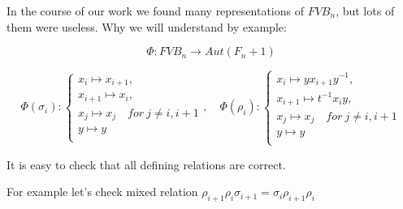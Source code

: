 \documentclass{article}
\begin{document}
\vspace{6pt}In the course of our work we found many representations of $FVB_n$, but lots of them were useless. Why we will understand by example:

$$\Phi : FVB_n \to Aut(F_n+1)$$

$$

\Phi(\sigma_i):

\begin{cases}

x_i \mapsto x_{i+1},\\

x_{i+1} \mapsto x_i,\\

x_j \mapsto x_j \quad for~j \not= i, i+1 \\

y \mapsto y \\

\end{cases},\quad

\Phi(\rho_i):

\begin{cases}

x_i \mapsto yx_{i+1}y^{-1},\\

x_{i+1} \mapsto t^{-1}x_iy,\\

x_j \mapsto x_j \quad for~j \not= i, i+1 \\

y \mapsto y \\

\end{cases}

$$



It is easy to check that all defining relations are correct.



For example let's check mixed relation $\rho_{i+1}\rho_i\sigma_{i+1} = \sigma_i\rho_{i+1}\rho_i$
\end{document}
